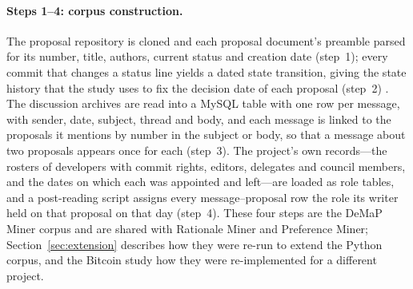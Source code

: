 \documentclass[sigconf,screen]{acmart}
\begin{document}
\paragraph{Steps 1--4: corpus construction.} The proposal repository is cloned and each proposal document's preamble parsed for its number, title, authors, current status and creation date (step~1); every commit that changes a status line yields a dated state transition, giving the state history that the study uses to fix the decision date of each proposal (step~2) \cite{sharma2022demap}. The discussion archives are read into a MySQL table with one row per message, with sender, date, subject, thread and body, and each message is linked to the proposals it mentions by number in the subject or body, so that a message about two proposals appears once for each (step~3). The project's own records---the rosters of developers with commit rights, editors, delegates and council members, and the dates on which each was appointed and left---are loaded as role tables, and a post-reading script assigns every message--proposal row the role its writer held on that proposal on that day (step~4). These four steps are the DeMaP Miner corpus and are shared with Rationale Miner and Preference Miner; Section~\ref{sec:extension} describes how they were re-run to extend the Python corpus, and the Bitcoin study \cite{influenceMinerBitcoin} how they were re-implemented for a different project.
\end{document}
